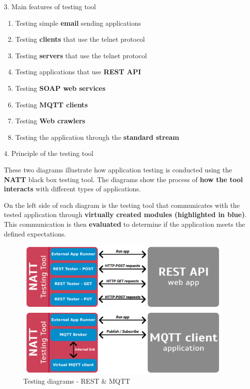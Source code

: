\documentclass[final]{beamer}
\newlength{\colwidth}
\begin{document}
\begin{frame}[t]
\begin{columns}[t]
\begin{column}{\colwidth}
\begin{alertblock}{3. Main features of testing tool}
    \begin{enumerate}
      \item Testing simple \textbf{email} sending applications
      \item Testing \textbf{clients} that use the telnet protocol
      \item Testing \textbf{servers} that use the telnet protocol
      \item Testing applications that use \textbf{REST API}
      \item Testing \textbf{SOAP web services}
      \item Testing \textbf{MQTT clients}
      \item Testing \textbf{Web crawlers}
      \item Testing the application through the \textbf{standard stream}
    \end{enumerate}

  \end{alertblock}

  \begin{block}{4. Principle of the testing tool}

    These two diagrams illustrate how application testing is conducted using the \textbf{NATT}
    black box testing tool. The diagrams show the process of \textbf{how the tool interacts} 
    with different types of applications. 

    \hspace{2em} On the left side of each diagram is the testing tool that communicates with 
    the tested application through \textbf{virtually created modules (highlighted in blue)}. This 
    communication is then \textbf{evaluated} to determine if the application meets the defined
    expectations.

    \begin{figure}
      \centering
        \includegraphics[width=0.97\textwidth]{./imgs/simple-test-diagram.png}
      \caption{Testing diagrams - REST \& MQTT}
    \end{figure}
  \end{block}


\end{column}
\end{columns}
\end{frame}
\end{document}
